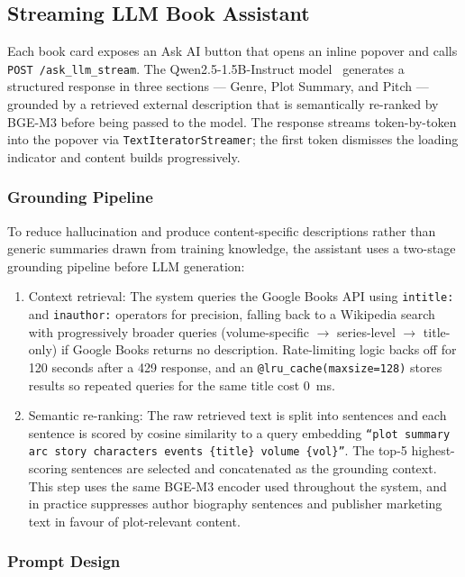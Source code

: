 \subsection{Streaming LLM Book Assistant}
\label{sec:llm_assistant}

Each book card exposes an Ask AI button that opens an inline popover and calls \texttt{POST /ask\_llm\_stream}.
The Qwen2.5-1.5B-Instruct model~\cite{qwen2025} generates a structured response in three sections — Genre, Plot Summary, and Pitch — grounded by a retrieved external description that is semantically re-ranked by BGE-M3 before being passed to the model.
The response streams token-by-token into the popover via \texttt{TextIteratorStreamer}; the first token dismisses the loading indicator and content builds progressively.

\subsubsection{Grounding Pipeline}

To reduce hallucination and produce content-specific descriptions rather than generic summaries drawn from training knowledge, the assistant uses a two-stage grounding pipeline before LLM generation:

\begin{enumerate}
    \item Context retrieval: The system queries the Google Books API using \texttt{intitle:} and \texttt{inauthor:} operators for precision, falling back to a Wikipedia search with progressively broader queries (volume-specific $\to$ series-level $\to$ title-only) if Google Books returns no description.
    Rate-limiting logic backs off for 120 seconds after a 429 response, and an \texttt{@lru\_cache(maxsize=128)} stores results so repeated queries for the same title cost 0~ms.
    \item Semantic re-ranking: The raw retrieved text is split into sentences and each sentence is scored by cosine similarity to a query embedding \texttt{``plot summary arc story characters events \{title\} volume \{vol\}''}.
    The top-5 highest-scoring sentences are selected and concatenated as the grounding context.
    This step uses the same BGE-M3 encoder used throughout the system, and in practice suppresses author biography sentences and publisher marketing text in favour of plot-relevant content.
\end{enumerate}

\subsubsection{Prompt Design}

